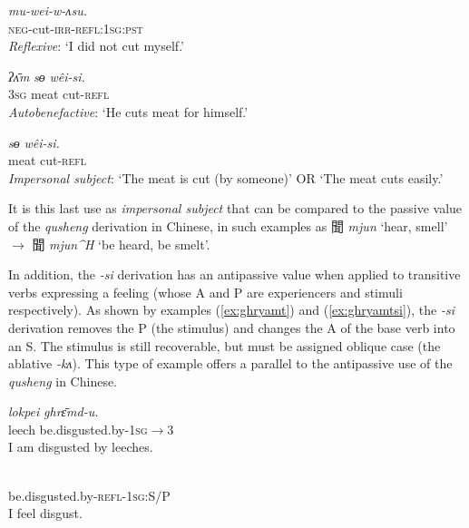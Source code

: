\documentclass[oneside,a4paper,11pt]{article}
\newcommand{\ipa}[1]{{\phon\textit{\mbox{#1}}}}
\newcommand{\zh}[1]{{\cn#1}}
\newcommand{\ch}[3]{\zh{#1} \ipa{#2} `#3'}
\begin{document}
\begin{exe}
\ex \label{ex:weiwasu} 
\gll 
	\ipa{mu-wei-w-ʌsu.}  \\
\textsc{neg}-cut-\textsc{irr}-\textsc{refl:1sg:pst} \\
\glt \textit{Reflexive}: `I did not cut myself.'
\end{exe}  

\begin{exe}
\ex \label{ex:weisi2} 
\gll 
 \ipa{ʔʌ̄m} \ipa{sɵ}  	\ipa{wêi-si.}  \\
\textsc{3sg} meat cut-\textsc{refl} \\
\glt \textit{Autobenefactive}: `He cuts meat for himself.'
\end{exe}
 
\begin{exe}
\ex \label{ex:weisi} 
\gll 
 \ipa{sɵ}  	\ipa{wêi-si.}  \\
 meat cut-\textsc{refl} \\
\glt \textit{Impersonal subject}: `The meat is cut (by someone)' OR `The meat cuts easily.'
\end{exe}

It is this last use as \textit{impersonal subject} that can be compared to the passive value of the \textit{qusheng} derivation in Chinese, in such examples as \ch{聞}{mjun}{hear, smell} $\rightarrow$ \ch{聞}{mjun^H}{be heard, be smelt}.

In addition, the \ipa{-si} derivation has an antipassive value when applied to transitive verbs expressing a feeling (whose A and P are experiencers and stimuli respectively). As shown by examples (\ref{ex:ghryamt})  and (\ref{ex:ghryamtsi}), the \ipa{-si} derivation removes the P (the stimulus) and changes the A of the base verb into an S. The stimulus is still recoverable, but must be assigned oblique case (the ablative \ipa{-kʌ}). This type of example offers a parallel to the antipassive use of the \textit{qusheng} in Chinese.

\begin{exe}
\ex \label{ex:ghryamt} 
\gll 
  	\ipa{lokpei}  	\ipa{ghrɛ̄md-u.}  \\
leech  be.disgusted.by-\textsc{1sg$\rightarrow$3} \\
 \glt  I am disgusted by leeches.
\end{exe}

\begin{exe}
\ex \label{ex:ghryamtsi} 
\gll \ipa{gʰrɛ̄m-si-ŋʌ}\\
 be.disgusted.by-\textsc{refl-1sg:S/P} \\
\glt  I feel disgust.
\end{exe}
\end{document}
